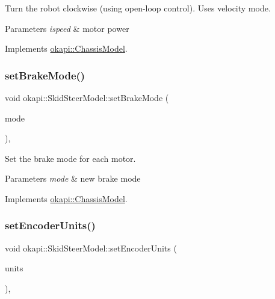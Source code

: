 Turn the robot clockwise (using open-\/loop control). Uses velocity mode.


\begin{DoxyParams}{Parameters}
{\em ispeed} & motor power \\
\hline
\end{DoxyParams}


Implements \mbox{\hyperlink{classokapi_1_1ChassisModel_af13aa5281c762eb61a444f0b35176014}{okapi\+::\+Chassis\+Model}}.

\mbox{\label{classokapi_1_1SkidSteerModel_a84c100815058f4dcdc958b3349713f73}} 
\subsubsection{\texorpdfstring{setBrakeMode()}{setBrakeMode()}}
{\footnotesize\ttfamily void okapi\+::\+Skid\+Steer\+Model\+::set\+Brake\+Mode (\begin{DoxyParamCaption}\item[{\mbox{\hyperlink{classokapi_1_1AbstractMotor_a132e0485dbb59a60c3f934338d8fa601}{Abstract\+Motor\+::brake\+Mode}}}]{mode }\end{DoxyParamCaption})\hspace{0.3cm}{\ttfamily [override]}, {\ttfamily [virtual]}}

Set the brake mode for each motor.


\begin{DoxyParams}{Parameters}
{\em mode} & new brake mode \\
\hline
\end{DoxyParams}


Implements \mbox{\hyperlink{classokapi_1_1ChassisModel_a20e3cde96d536e6c722aa5686e5cc8e8}{okapi\+::\+Chassis\+Model}}.

\mbox{\label{classokapi_1_1SkidSteerModel_a8922c028a9f09893061938fe50fb2a79}} 
\subsubsection{\texorpdfstring{setEncoderUnits()}{setEncoderUnits()}}
{\footnotesize\ttfamily void okapi\+::\+Skid\+Steer\+Model\+::set\+Encoder\+Units (\begin{DoxyParamCaption}\item[{\mbox{\hyperlink{classokapi_1_1AbstractMotor_ae811cd825099f2defadeb1b7f7e7764c}{Abstract\+Motor\+::encoder\+Units}}}]{units }\end{DoxyParamCaption})\hspace{0.3cm}{\ttfamily [override]}, {\ttfamily [virtual]}}

